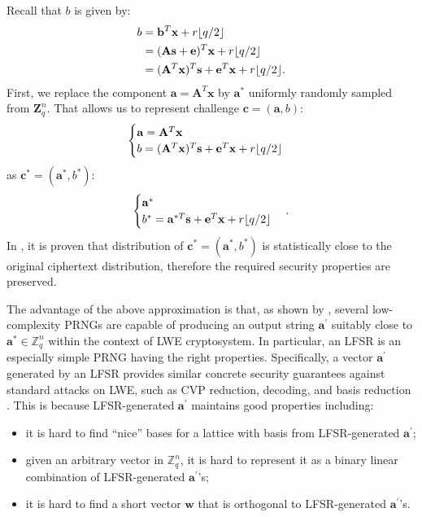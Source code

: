 Recall that $b$ is given by: 
\begin{align*}
    b&=\mathbf{b}^T\mathbf{x}+r\lfloor q/2\rfloor\\
    &= (\mathbf{A}\mathbf{s}+\mathbf{e})^T\mathbf{x}+r\lfloor q/2\rfloor\\
    &=(\mathbf{A}^T\mathbf{x})^T\mathbf{s}+\mathbf{e}^T\mathbf{x}+r\lfloor q/2\rfloor.
\end{align*}
First, we replace the component $\mathbf{a}=\mathbf{A}^T\mathbf{x}$ by $\mathbf{a}^*$ uniformly randomly sampled from $\mathbf{Z}_q^n$. That allows us to represent challenge $\mathbf{c} = (\mathbf{a},b)$:
\begin{equation*}
    \begin{cases}
    \mathbf{a}= \mathbf{A}^T\mathbf{x}\\
    b = (\mathbf{A}^T\mathbf{x})^T\mathbf{s}+\mathbf{e}^T\mathbf{x}+r\lfloor q/2\rfloor
    \end{cases}
\end{equation*}
as $\mathbf{c}^*=(\mathbf{a}^*,b^*)$:
\begin{equation*}
    \begin{cases}
    \mathbf{a}^*\\
    b^*=\mathbf{a}^{*T}\mathbf{s}+\mathbf{e}^T\mathbf{x}+r\lfloor q/2\rfloor
    \end{cases}.
\end{equation*}
In \cite{akavia2009simultaneous}, it is proven that distribution of $\mathbf{c}^*=(\mathbf{a}^*,b^*)$ is statistically close to the original ciphertext distribution, therefore the required security properties are preserved.  

The advantage of the above approximation is that, as shown by \cite{galbraith2013space}, several low-complexity  PRNGs are capable of producing an output string $\mathbf{a}^\prime$ suitably close to $\mathbf{a^*}\in\mathbb{Z}^n_q$ within the context of LWE cryptosystem. In particular, an LFSR is an especially simple PRNG having the right properties.
Specifically, a vector $\mathbf{a}^\prime$ generated by an LFSR provides similar concrete security guarantees against standard attacks on LWE, such as CVP reduction, decoding, and basis reduction \cite{galbraith2013space}.
This is because LFSR-generated $\mathbf{a}^\prime$ maintains good properties including:
\begin{itemize}
    \item it is hard to find ``nice'' bases for a lattice with basis from LFSR-generated $\mathbf{a}^\prime$;
    \item given an arbitrary vector in $\mathbb{Z}_q^n$, it is hard to represent it as a binary linear combination of LFSR-generated $\mathbf{a}^\prime$'s;
    \item it is hard to find a short vector $\mathbf{w}$ that is orthogonal to LFSR-generated $\mathbf{a}^\prime$'s.
\end{itemize}

